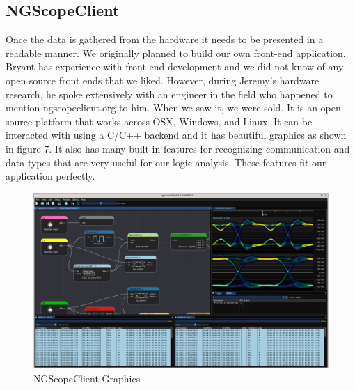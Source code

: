 \subsection{NGScopeClient}
	Once the data is gathered from the hardware it needs to be presented in a readable manner. We originally planned to build our own front-end application. Bryant has experience with front-end development and we did not know of any open source front ends that we liked. However, during Jeremy's hardware research, he spoke extensively with an engineer in the field who happened to mention ngscopeclient.org to him. When we saw it, we were sold. It is an open-source platform that works across OSX, Windows, and Linux. It can be interacted with using a C/C++ backend and it has beautiful graphics as shown in figure 7. It also has many built-in features for recognizing communication and data types that are very useful for our logic analysis. These features fit our application perfectly. 
	
		\begin{figure}[H]
		\centering
		\includegraphics[width=0.8\linewidth]{images/ngscopeclient-intro.png}
		\caption{NGScopeClient Graphics \cite{ngscope_intro}}
		\label{fig:ngscope-client}
		\vspace{15px}
	\end{figure}
	

	‌